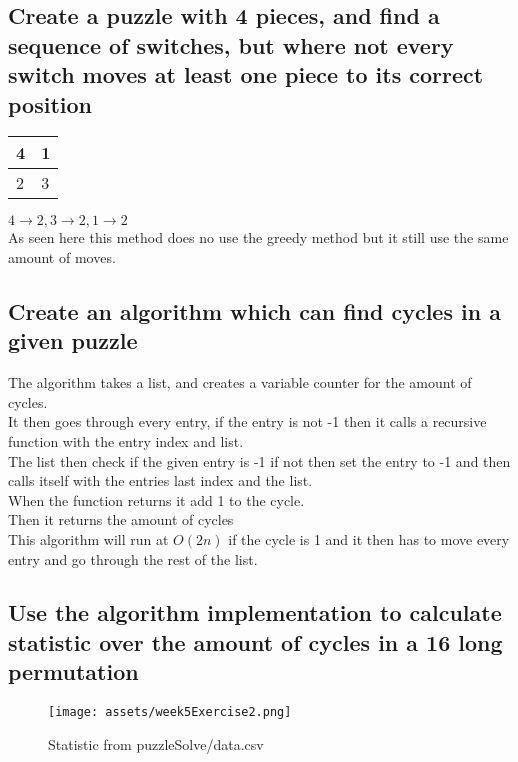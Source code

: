 \documentclass[12pt, a4paper]{article}
\begin{document}
			\subsection{Create a puzzle with 4 pieces, and find a sequence of switches, but where not every switch moves at least one piece to its correct position}
				\begin{table}[h!]
					\begin{tabular}{|l|l|}
					\hline
					4&1\\\hline
					2&3\\\hline
					\end{tabular}
				\end{table}	
				$4\rightarrow 2,3\rightarrow 2, 1\rightarrow 2$\\
				As seen here this method does no use the greedy method but it still use the same amount of moves.
			\subsection{Create an algorithm which can find cycles in a given puzzle}
				The algorithm takes a list, and creates a variable counter for the amount of cycles.\\
				It then goes through every entry, if the entry is not -1 then it calls a recursive function with the entry index and list.\\
				The list then check if the given entry is -1 if not then set the entry to -1 and then calls itself with the entries last index and the list.\\
				When the function returns it add 1 to the cycle.\\
				Then it returns the amount of cycles\\
				This algorithm will run at $O(2n)$ if the cycle is 1 and it then has to move every entry and go through the rest of the list. 
			\subsection{Use the algorithm implementation to calculate statistic over the amount of cycles in a 16 long permutation}
				\begin{figure}[h!]
					\texttt{[image: assets/week5Exercise2.png]}
					\caption{Statistic from puzzleSolve/data.csv}
				\end{figure}
\end{document}
